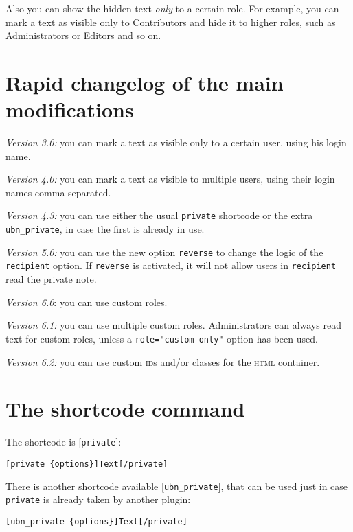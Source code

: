 \documentclass[
	titlepage,
	headinclude,
	abstract=on,
	paper=a4,
	fontsize=11pt,
]{scrartcl}
\begin{document}
Also you can show the hidden text \textit{only} to a certain role. For example, you can mark a text as visible only to Contributors and hide it to higher roles, such as Administrators or Editors and so on.

\section{Rapid changelog of the main modifications}

\begin{description}
 \item \textit{Version 3.0:} you can mark a text as visible only to a certain user, using his login name.
 \item \textit{Version 4.0:} you can mark a text as visible to multiple users, using their login names comma separated.
 \item \textit{Version 4.3:} you can use either the usual \verb+private+ shortcode or the extra \verb+ubn_private+, in case the first is already in use.
 \item \textit{Version 5.0:} you can use the new option \verb+reverse+ to change the logic of the \verb+recipient+ option. If \verb+reverse+ is activated, it will not allow users in \verb+recipient+ read the private note.
 \item \textit{Version 6.0}: you can use custom roles.
 \item \textit{Version 6.1:} you can use multiple custom roles. Administrators can always read text for custom roles, unless a \verb+role="custom-only"+ option has been used.
 \item \textit{Version 6.2:} you can use custom \textsc{id}s and/or classes for the \textsc{html} container.
\end{description}

\section{The shortcode command}

The shortcode is [\verb+private+]:

\begin{lstlisting}
[private {options}]Text[/private]
\end{lstlisting}

There is another shortcode available [\verb+ubn_private+], that can be used just in case \verb+private+ is already taken by another plugin:

\begin{lstlisting}
[ubn_private {options}]Text[/private]
\end{lstlisting}
\end{document}
